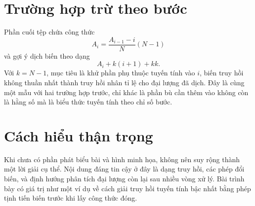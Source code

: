 \documentclass[11pt]{article}
\begin{document}
\section{Trường hợp trừ theo bước}

Phần cuối tệp chứa công thức
\[
  A_i=\frac{A_{i-1}-i}{N}(N-1)
\]
và gợi ý dịch biến theo dạng
\[
  A_i+k(i+1)+kk.
\]
Với \(k=N-1\), mục tiêu là khử phần phụ thuộc tuyến tính vào \(i\), biến truy
hồi không thuần nhất thành truy hồi nhân tỉ lệ cho đại lượng đã dịch. Đây là
cùng một mẫu với hai trường hợp trước, chỉ khác là phần bù cần thêm vào không
còn là hằng số mà là biểu thức tuyến tính theo chỉ số bước.

\section{Cách hiểu thận trọng}

Khi chưa có phần phát biểu bài và hình minh họa, không nên suy rộng thành một
lời giải cụ thể. Nội dung đáng tin cậy ở đây là dạng truy hồi, các phép đổi
biến, và định hướng phân tích đại lượng còn lại sau nhiều vòng xử lý. Bài
trình bày có giá trị như một ví dụ về cách giải truy hồi tuyến tính bậc nhất
bằng phép tịnh tiến biến trước khi lấy công thức đóng.
\end{document}
